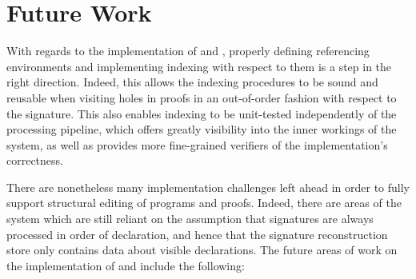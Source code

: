 \section{Future Work}

With regards to the implementation of \Beluga and \Harpoon, properly defining referencing environments and implementing indexing with respect to them is a step in the right direction.
Indeed, this allows the indexing procedures to be sound and reusable when visiting holes in \Harpoon proofs in an out-of-order fashion with respect to the \Beluga signature.
This also enables indexing to be unit-tested independently of the processing pipeline, which offers greatly visibility into the inner workings of the system, as well as provides more fine-grained verifiers of the implementation's correctness.

There are nonetheless many implementation challenges left ahead in order to fully support structural editing of \Beluga programs and \Harpoon proofs.
Indeed, there are areas of the system which are still reliant on the assumption that signatures are always processed in order of declaration, and hence that the signature reconstruction store only contains data about visible declarations.
The future areas of work on the implementation of \Beluga and \Harpoon include the following:

